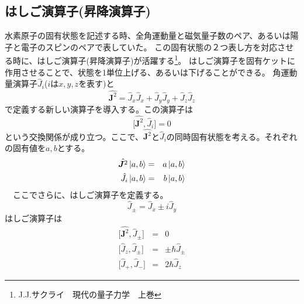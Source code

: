 \documentclass[11pt,a4paper]{jsarticle}
\begin{document}

\clearpage

\begin{boxnote}
  \subsection*{はしご演算子(昇降演算子)}
  水素原子の固有状態を記述する時、全角運動量と磁気量子数のペア、あるいは陽子と電子のスピンのペアで表していた。
  この固有状態の２つ表し方を対応させる時に、はしご演算子(昇降演算子)が活躍する\footnote{J.J.サクライ　現代の量子力学　上巻}。
  はしご演算子を固有ケットに作用させることで、状態を1単位上げる、あるいは下げることができる。
  角運動量演算子$\hat{J}_i$($i$は$x,y,z$を表す)と
  \begin{equation}
    \hat{\bm{J}^2} = \hat{J}_x \hat{J}_x + \hat{J}_y \hat{J}_y + \hat{J}_z \hat{J}_z
  \end{equation}
  で定義する新しい演算子を導入する。この演算子は
  \begin{equation}
    \bigl[\hat{\bm{J}^2},\hat{J}_i\bigr] = 0
  \end{equation}
  という交換関係が成り立つ。ここで、$\hat{\bm{J}^2}$と$\hat{J}_i$の同時固有状態を考える。それぞれの固有値を$a,b$とする。
  \begin{eqnarray}
    \hat{\bm{J}^2} \ket{a,b} &=& a \ket{a,b}\\
    \hat{J}_i \ket{a,b} &=& b \ket{a,b}
  \end{eqnarray}
　ここでさらに、はしご演算子を定義する。
 \begin{equation}
   \hat{J}_\pm = \hat{J}_x \pm i \hat{J}_y
 \end{equation}
 はしご演算子は
 \begin{eqnarray}
   \bigl[\hat{\bm{J}^2},\hat{J}_\pm \bigr] &=& 0 \\
   \bigl[\hat{J}_z,\hat{J}_\pm \bigr] &=& \pm \hbar \hat{J}_\pm \\
   \bigl[\hat{J}_+,\hat{J}_- \bigr] &=& 2 \hbar \hat{J}_z

\end{eqnarray}
\end{boxnote}
\end{document}
